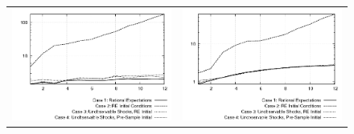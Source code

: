 \begin{figure}
\begin{tabular}{cc}
\includegraphics[scale=0.5]{inflation_fore.png} & \includegraphics[scale=0.5]{fedfunds_fore.png} \\ 
\end{tabular}
\end{figure}
